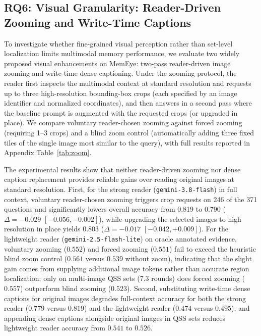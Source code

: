 \documentclass[10pt]{article}
\newcommand{\qss}{QSS}
\begin{document}
\subsection{RQ6: Visual Granularity: Reader-Driven Zooming and Write-Time Captions}
\label{sec:rq6}

To investigate whether fine-grained visual perception rather than set-level localization limits multimodal memory performance, we evaluate two widely proposed visual enhancements on MemEye: two-pass reader-driven image zooming and write-time dense captioning. Under the zooming protocol, the reader first inspects the multimodal context at standard resolution and requests up to three high-resolution bounding-box crops (each specified by an image identifier and normalized coordinates), and then answers in a second pass where the baseline prompt is augmented with the requested crops (or upgraded in place). We compare voluntary reader-chosen zooming against forced zooming (requiring 1--3 crops) and a blind zoom control (automatically adding three fixed tiles of the single image most similar to the query), with full results reported in Appendix Table~\ref{tab:zoom}.

The experimental results show that neither reader-driven zooming nor dense caption replacement provides reliable gains over reading original images at standard resolution. First, for the strong reader (\texttt{gemini-3.8-flash}) in full context, voluntary reader-chosen zooming triggers crop requests on 246 of the 371 questions and significantly lowers overall accuracy from 0.819 to 0.790 ($\Delta = -0.029$ $[-0.056, -0.002]$), while upgrading the selected images to high resolution in place yields $0.803$ ($\Delta = -0.017$ $[-0.042, +0.009]$). For the lightweight reader (\texttt{gemini-2.5-flash-lite}) on oracle annotated evidence, voluntary zooming ($0.552$) and forced zooming ($0.551$) fail to exceed the heuristic blind zoom control ($0.561$ versus $0.539$ without zoom), indicating that the slight gain comes from supplying additional image tokens rather than accurate region localization; only on multi-image \qss{} sets (7.3 rounds) does forced zooming ($0.557$) outperform blind zooming ($0.523$). Second, substituting write-time dense captions for original images degrades full-context accuracy for both the strong reader ($0.779$ versus $0.819$) and the lightweight reader ($0.474$ versus $0.495$), and appending dense captions alongside original images in \qss{} sets reduces lightweight reader accuracy from $0.541$ to $0.526$.
\end{document}
